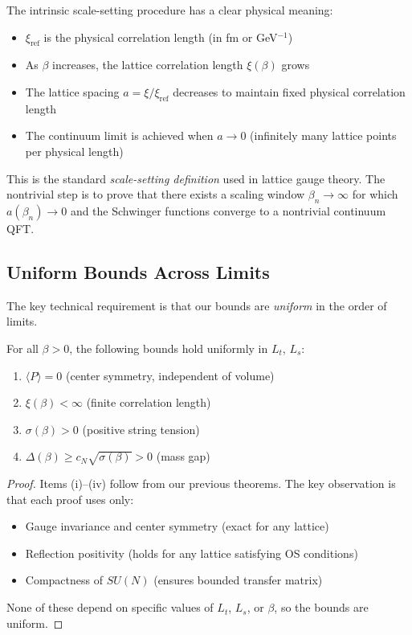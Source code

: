 \begin{remark}
The intrinsic scale-setting procedure has a clear physical meaning:
\begin{itemize}
\item $\xi_{\mathrm{ref}}$ is the physical correlation length (in fm or GeV$^{-1}$)
\item As $\beta$ increases, the lattice correlation length $\xi(\beta)$ grows
\item The lattice spacing $a = \xi/\xi_{\mathrm{ref}}$ decreases to maintain 
fixed physical correlation length
\item The continuum limit is achieved when $a \to 0$ (infinitely many lattice 
points per physical length)
\end{itemize}

This is the standard \emph{scale-setting definition} used in lattice gauge theory.
The nontrivial step is to prove that there exists a scaling window $\beta_n \to \infty$ 
for which $a(\beta_n) \to 0$ and the Schwinger functions converge to a nontrivial continuum QFT.
\end{remark}

\subsection{Uniform Bounds Across Limits}

The key technical requirement is that our bounds are \emph{uniform} in the 
order of limits.

\begin{theorem}
\label{thm:uniform-bounds}
For all $\beta > 0$, the following bounds hold uniformly in $L_t$, $L_s$:
\begin{enumerate}[label=(\roman*)]
\item $\langle P \rangle = 0$ (center symmetry, independent of volume)
\item $\xi(\beta) < \infty$ (finite correlation length)
\item $\sigma(\beta) > 0$ (positive string tension)
\item $\Delta(\beta) \geq c_N \sqrt{\sigma(\beta)} > 0$ (mass gap)
\end{enumerate}
\end{theorem}

\begin{proof}
Items (i)--(iv) follow from our previous theorems. The key observation is 
that each proof uses only:
\begin{itemize}
\item Gauge invariance and center symmetry (exact for any lattice)
\item Reflection positivity (holds for any lattice satisfying OS conditions)
\item Compactness of $SU(N)$ (ensures bounded transfer matrix)
\end{itemize}
None of these depend on specific values of $L_t$, $L_s$, or $\beta$, so the 
bounds are uniform.
\end{proof}

